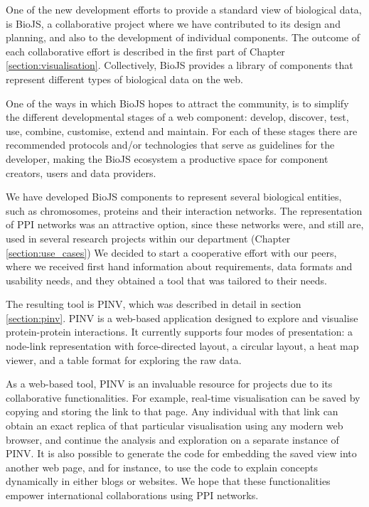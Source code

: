 \vspace{5mm}

One of the new development efforts to provide a standard view of biological data, is BioJS, a collaborative project where we have contributed to its design and planning, and also to the development of individual components.  The outcome of each collaborative effort is described in the first part of Chapter \ref{section:visualisation}. Collectively, BioJS provides a library of components that represent different types of biological data on the web. 

One of the ways in which BioJS hopes to attract the community, is to simplify the different developmental stages of a web component: develop, discover, test, use, combine, customise, extend and maintain. For each of these stages there are recommended protocols and/or technologies that serve as guidelines for the developer, making the BioJS ecosystem a productive space for component creators, users and data providers.

We have developed BioJS components to represent several biological entities, such as chromosomes, proteins and their interaction networks. The representation of PPI networks was an attractive option, since these networks were, and still are, used in several research projects within our department (Chapter \ref{section:use_cases}) We decided to start a cooperative effort with our peers, where we received first hand information about requirements, data formats and usability needs, and they obtained a tool that was tailored to their needs.

The resulting tool is PINV, which was described in detail in section \ref{section:pinv}. PINV is a web-based application designed to explore and visualise protein-protein interactions. It currently supports four modes of presentation: a node-link representation with force-directed layout, a circular layout, a heat map viewer, and a table format for exploring the raw data. 

As a web-based tool, PINV is an invaluable resource for projects due to its collaborative functionalities. For example, real-time visualisation can be saved by copying and storing the link to that page. Any individual with that link can obtain an exact replica of that particular visualisation using any modern web browser, and continue the analysis and exploration on a separate instance of PINV. It is also possible to generate the code for embedding the saved view into another web page, and for instance, to use the code to explain concepts dynamically  in either blogs or websites. We hope that these functionalities empower international collaborations using PPI networks.

